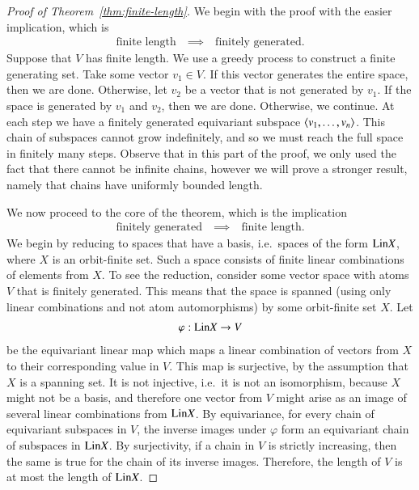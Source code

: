 \begin{proof}[Proof of Theorem~\ref{thm:finite-length}]

   We begin with the proof with the easier implication, which is
    \begin{align*}
    \text{finite length} \quad \implies \quad \text{finitely generated.}
    \end{align*}
    Suppose that $V$ has finite length. We use a greedy process to construct a finite generating set. Take some vector $v_1 \in V$. If this vector generates the entire space, then we are done. Otherwise, let $v_2$ be a vector that is not generated by $v_1$. If  the space is generated by $v_1$ and $v_2$, then we are done. Otherwise, we continue. At each step we have a finitely generated equivariant subspace $\langle v_1,\ldots,v_n \rangle$. This chain of subspaces cannot grow indefinitely, and so we must reach the full space in finitely many steps. Observe that in this part of the proof, we only used the fact that there cannot be infinite chains, however we will prove a stronger result, namely that chains have  uniformly bounded length. 
    
    We now proceed to the core of the theorem, which is the implication
    \begin{align*}
    \text{finitely generated} \quad \implies \quad \text{finite length.}
    \end{align*}
    We begin  by reducing to spaces that have a basis, i.e.~spaces of the form $\mathrm{Lin} X$, where $X$ is an orbit-finite set. Such a space consists of finite linear combinations of elements from $X$.
    To see the reduction, consider some vector space with atoms $V$ that is finitely generated. This means that the space is spanned (using only linear combinations and not atom automorphisms) by some orbit-finite set $X$.  Let
    \begin{align*}
    \varphi : \mathrm{Lin} X \to V
    \end{align*}
    be the equivariant linear map which maps a linear combination of vectors from $X$ to their corresponding value in $V$.  This map is surjective, by the assumption that $X$ is a spanning set. It is not injective, i.e.~it is not an isomorphism, because $X$ might not be a basis, and therefore one vector from $V$ might arise as an image of several linear combinations from $\mathrm{Lin} X$.  By equivariance, for every chain of equivariant subspaces in $V$, the inverse images under $\varphi$ form an equivariant chain of subspaces in $\mathrm{Lin} X$. By surjectivity, if a chain in $V$ is strictly increasing, then the same is true for the chain of its inverse images. Therefore, the length of $V$ is at most the length of $\mathrm{Lin} X$. 
    

\end{proof}
